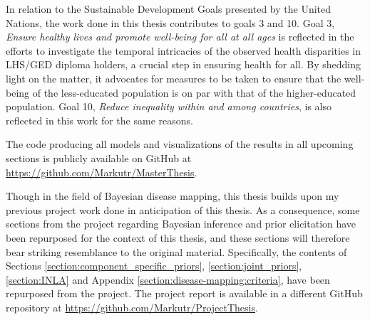 In relation to the Sustainable Development Goals \citep{UNSDG} presented by the United Nations, the work done in this thesis contributes to goals 3 and 10. Goal 3, \textit{Ensure healthy lives and promote well-being for all at all ages} is reflected in the efforts to investigate the temporal intricacies of the observed health disparities in LHS/GED diploma holders, a crucial step in ensuring health for all. By shedding light on the matter, it advocates for measures to be taken to ensure that the well-being of the less-educated population is on par with that of the higher-educated population. Goal 10, \textit{Reduce inequality within and among countries}, is also reflected in this work for the same reasons.

The code producing all models and visualizations of the results in all upcoming sections is publicly available on GitHub at \url{https://github.com/Markutr/MasterThesis}.

Though in the field of Bayesian disease mapping, this thesis builds upon my previous project work \citep{Prosjektoppgave} done in anticipation of this thesis. As a consequence, some sections from the project regarding Bayesian inference and prior elicitation have been repurposed for the context of this thesis, and these sections will therefore bear striking resemblance to the original material. Specifically, the contents of Sections \ref{section:component_specific_priors}, \ref{section:joint_priors}, \ref{section:INLA} and Appendix \ref{section:disease-mapping:criteria}, have been repurposed from the project. The project report is available in a different GitHub repository at \url{https://github.com/Markutr/ProjectThesis}.






